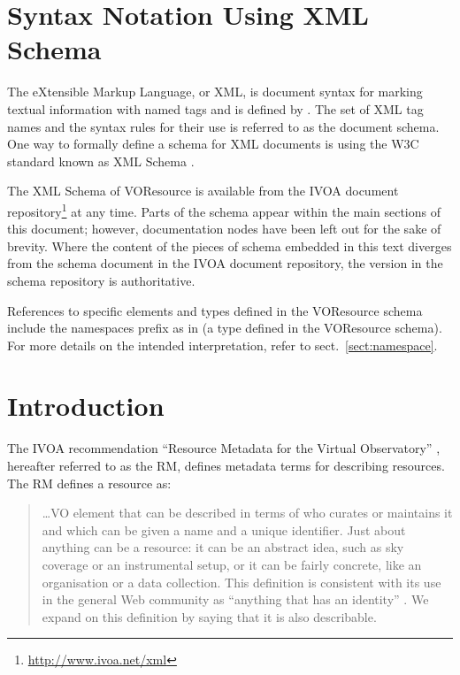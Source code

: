 \documentclass[11pt,a4paper]{ivoa}
\begin{document}
\section*{Syntax Notation Using XML Schema}

The eXtensible Markup Language, or XML, is document syntax for marking
textual information with named tags and is defined by \citet{std:XML}.
The set of XML tag names and the syntax
rules for their use is referred to as the document schema.  One way to
formally define a schema for XML documents is using the W3C standard
known as XML Schema \citep{std:XSD}.

The XML Schema of VOResource is
available from the IVOA document
repository\footnote{\url{http://www.ivoa.net/xml}} at any time.
Parts of the schema appear within the main sections of this document;
however, documentation nodes have been left out for the sake of brevity.
Where the content of the pieces of schema embedded in this text
diverges from the schema document in the IVOA document
repository, the version in the schema repository is authoritative.

References to specific elements and types defined in the VOResource
schema include the namespaces prefix  as in
 (a type defined in the VOResource schema).  For more
details on the intended interpretation, refer to
sect.~\ref{sect:namespace}.

\section{Introduction}

The IVOA recommendation ``Resource Metadata for the Virtual
Observatory''
\citep{2007ivoa.spec.0302H}, hereafter referred to as the RM, defines
metadata terms for describing resources.  The RM defines a resource as: 

\begin{quotation}
\dots VO element that can be described in terms of who curates or
maintains it and which can be given a name and a unique identifier.
Just about anything can be a resource: it can be an abstract idea,
such as sky coverage or an instrumental setup, or it can be fairly
concrete, like an organisation or a data collection.  This definition
is consistent with its use in the general Web community as
``anything that has an identity'' \citep{std:RFC3986}.  We
expand on this definition by saying that it is also describable.  
\end{quotation}
\end{document}

